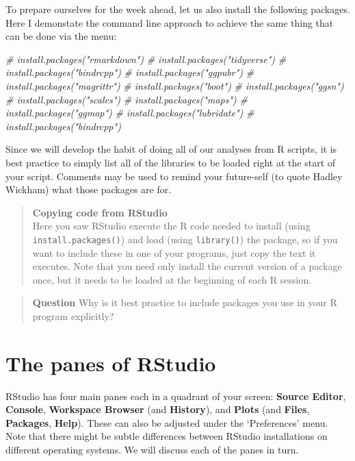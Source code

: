 \documentclass[
]{book}
\newenvironment{Shaded}{\begin{snugshade}}{\end{snugshade}}
\newcommand{\CommentTok}[1]{\textcolor[rgb]{0.56,0.35,0.01}{\textit{#1}}}
\begin{document}
To prepare ourselves for the week ahead, let us also install the following packages. Here I demonstate the command line approach to achieve the same thing that can be done via the menu:

\begin{Shaded}
\begin{Highlighting}[]
\CommentTok{\# install.packages("rmarkdown")}
\CommentTok{\# install.packages("tidyverse")}
\CommentTok{\# install.packages("bindrcpp")}
\CommentTok{\# install.packages("ggpubr")}
\CommentTok{\# install.packages("magrittr")}
\CommentTok{\# install.packages("boot")}
\CommentTok{\# install.packages("ggsn")}
\CommentTok{\# install.packages("scales")}
\CommentTok{\# install.packages("maps")}
\CommentTok{\# install.packages("ggmap")}
\CommentTok{\# install.packages("lubridate")}
\CommentTok{\# install.packages("bindrcpp")}
\end{Highlighting}
\end{Shaded}

Since we will develop the habit of doing all of our analyses from R scripts, it is best practice to simply list all of the libraries to be loaded right at the start of your script. Comments may be used to remind your future-self (to quote Hadley Wickham) what those packages are for.

\begin{quote}
\textbf{Copying code from RStudio}\\
Here you saw RStudio execute the R code needed to install (using \texttt{install.packages()}) and load (using \texttt{library()}) the package, so if you want to include these in one of your programs, just copy the text it executes. Note that you need only install the current version of a package once, but it needs to be loaded at the beginning of each R session.
\end{quote}

\begin{quote}
\textbf{Question}
Why is it best practice to include packages you use in your R program explicitly?
\end{quote}

\hypertarget{the-panes-of-rstudio}{%
\section{The panes of RStudio}\label{the-panes-of-rstudio}}

RStudio has four main panes each in a quadrant of your screen: \textbf{Source Editor}, \textbf{Console}, \textbf{Workspace Browser} (and \textbf{History}), and \textbf{Plots} (and \textbf{Files}, \textbf{Packages}, \textbf{Help}). These can also be adjusted under the `Preferences' menu. Note that there might be subtle differences between RStudio installations on different operating systems. We will discuss each of the panes in turn.
\end{document}
